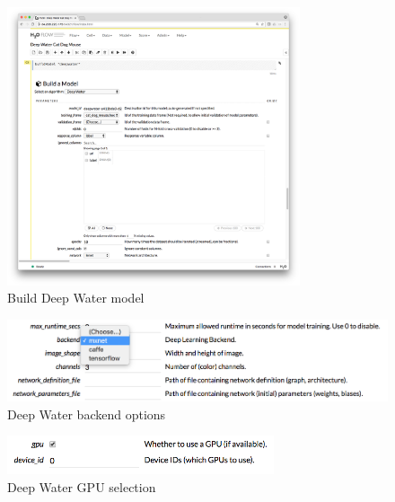 	\begin{figure}[H]
	\begin{center}
		\includegraphics[width=0.77\textwidth]{images/flow-build-dw-model.png}
		\caption{Build Deep Water model}\label{fig:flow-build-dw-model}
	\end{center}
	\end{figure}
	
	\newpage
	\begin{figure}[H]
	\begin{center}
		\includegraphics[width=\textwidth]{images/flow-backend.png}
		\caption{Deep Water backend options}\label{fig:flow-backend}
	\end{center}
	\end{figure}
	\begin{figure}[H]
	\begin{center}
		\includegraphics[width=0.7\textwidth]{images/flow-gpu.png}
		\caption{Deep Water GPU selection}\label{fig:flow-gpu}
	\end{center}
	\end{figure}

\newpage
